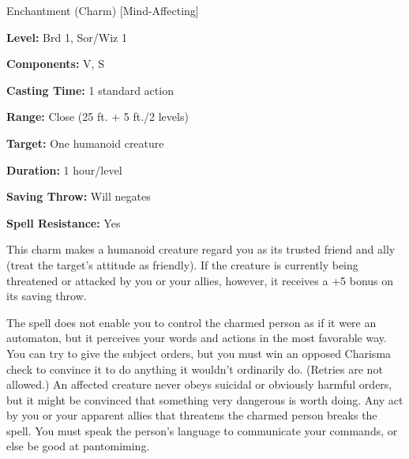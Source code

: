 
Enchantment (Charm) [Mind-Affecting]

\textbf{Level:} Brd 1, Sor/Wiz 1

\textbf{Components:} V, S

\textbf{Casting Time:} 1 standard action

\textbf{Range:} Close (25 ft. + 5 ft./2 levels)

\textbf{Target:} One humanoid creature

\textbf{Duration:} 1 hour/level

\textbf{Saving Throw:} Will negates

\textbf{Spell Resistance:} Yes

This charm makes a humanoid creature regard you as its trusted friend and ally 
(treat the target's attitude as friendly). If the creature is currently being threatened 
or attacked by you or your allies, however, it receives a +5 bonus on its saving 
throw.

The spell does not enable you to control the charmed person as if it were 
an automaton, but it perceives your words and actions in the most favorable way. 
You can try to give the subject orders, but you must win an opposed Charisma check 
to convince it to do anything it wouldn't ordinarily do. (Retries are not allowed.) 
An affected creature never obeys suicidal or obviously harmful orders, but it might 
be convinced that something very dangerous is worth doing.  Any act by you or your 
apparent allies that threatens the charmed person breaks the spell. You 
must speak the person's language to communicate your commands, or else be good 
at pantomiming.

